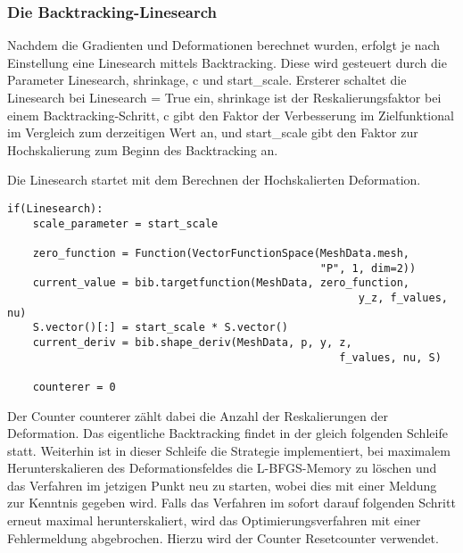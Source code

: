 \subsubsection{Die Backtracking-Linesearch}
\label{backtracking}
Nachdem die Gradienten und Deformationen berechnet wurden, erfolgt je nach Einstellung eine Linesearch mittels Backtracking. Diese wird gesteuert durch die Parameter \textsf{Linesearch}, \textsf{shrinkage}, \textsf{c} und \textsf{start\_scale}. Ersterer schaltet die Linesearch bei \textsf{Linesearch = True} ein, \textsf{shrinkage} ist der Reskalierungsfaktor bei einem Backtracking-Schritt, \textsf{c} gibt den Faktor der Verbesserung im Zielfunktional im Vergleich zum derzeitigen Wert an, und \textsf{start\_scale} gibt den Faktor zur Hochskalierung zum Beginn des Backtracking an.

Die Linesearch startet mit dem Berechnen der Hochskalierten Deformation.
\begin{lstlisting}
if(Linesearch):
	scale_parameter = start_scale

    zero_function = Function(VectorFunctionSpace(MeshData.mesh,
                                                 "P", 1, dim=2))
    current_value = bib.targetfunction(MeshData, zero_function,
        								               y_z, f_values, nu)
    S.vector()[:] = start_scale * S.vector()
    current_deriv = bib.shape_deriv(MeshData, p, y, z, 
    								                f_values, nu, S)

    counterer = 0
\end{lstlisting}
Der Counter \textsf{counterer} zählt dabei die Anzahl der Reskalierungen der Deformation. Das eigentliche Backtracking findet in der gleich folgenden Schleife statt. Weiterhin ist in dieser Schleife die Strategie implementiert, bei maximalem Herunterskalieren des Deformationsfeldes die L-BFGS-Memory zu löschen und das Verfahren im jetzigen Punkt neu zu starten, wobei dies mit einer Meldung zur Kenntnis gegeben wird. Falls das Verfahren im sofort darauf folgenden Schritt erneut maximal herunterskaliert, wird das Optimierungsverfahren mit einer Fehlermeldung abgebrochen. Hierzu wird der Counter \textsf{Resetcounter} verwendet.

